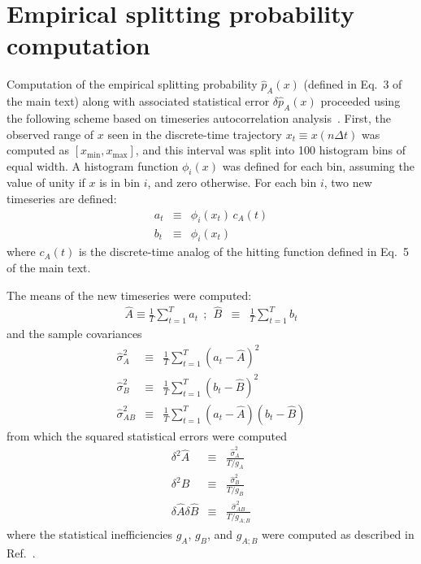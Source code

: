 \documentclass[aps,prl,twocolumn,superscriptaddress,floatfix]{revtex4-1}
\begin{document}
\section{Empirical splitting probability computation}

Computation of the empirical splitting probability $\hat{p}_A(x)$ (defined in Eq.~3 of the main text) along with associated statistical error $\delta \hat{p}_A(x)$ proceeded using the following scheme based on timeseries autocorrelation analysis~\cite{swope:1982a,janke:2002a}.
First, the observed range of $x$ seen in the discrete-time trajectory $x_t \equiv x(n\Delta t)$ was computed as $[x_\mathrm{min},x_\mathrm{max}]$, and this interval was split into 100 histogram bins of equal width.
A histogram function $\phi_i(x)$ was defined for each bin, assuming the value of unity if $x$ is in bin $i$, and zero otherwise.
For each bin $i$, two new timeseries are defined:
\begin{eqnarray}
a_t &\equiv& \phi_i(x_t) \, c_A(t) \nonumber \\
b_t &\equiv& \phi_i(x_t)
\end{eqnarray}
where $c_A(t)$ is the discrete-time analog of the hitting function defined in Eq.~5 of the main text.

The means of the new timeseries were computed:
\begin{eqnarray}
\hat{A} \equiv \frac{1}{T} \sum_{t=1}^T a_t \:\:;\:\: \hat{B} &\equiv& \frac{1}{T} \sum_{t=1}^T b_t 
\end{eqnarray}
and the sample covariances
\begin{eqnarray}
\hat{\sigma}^2_A &\equiv& \frac{1}{T} \sum_{t=1}^T (a_t - \hat{A})^2 \nonumber \\
\hat{\sigma}^2_B &\equiv& \frac{1}{T} \sum_{t=1}^T (b_t - \hat{B})^2 \nonumber \\
\hat{\sigma}^2_{AB} &\equiv& \frac{1}{T} \sum_{t=1}^T (a_t - \hat{A}) (b_t - \hat{B})
\end{eqnarray}
from which the squared statistical errors were computed
\begin{eqnarray}
\delta^2 \hat{A} &\equiv& \frac{\hat{\sigma}^2_A}{T / g_{A}} \nonumber \\
\delta^2 \hat{B} &\equiv& \frac{\hat{\sigma}^2_B}{T / g_{B}} \nonumber \\
\delta \hat{A} \delta \hat{B} &\equiv& \frac{\hat{\sigma}^2_{AB}}{T / g_{A;B}}
\end{eqnarray}
where the statistical inefficiencies $g_A$, $g_B$, and $g_{A;B}$ were computed as described in Ref.~\cite{chodera:jctc:2007}. 
\end{document}
